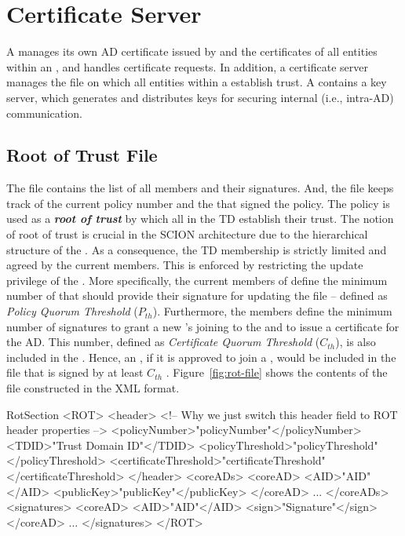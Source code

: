 \section{Certificate Server}
A \CS manages its own AD certificate issued by \TDC and the certificates of all entities within an \AD, and handles certificate requests. In addition, a \TDC certificate server manages the \RT file on which all entities within a \TD establish {trust}. A \CS contains a key server, which generates and distributes keys for securing internal (i.e., intra-AD) communication.

\subsection{Root of Trust File} \label{subsec:root-of-trust}
The \RT file contains the list of all \TDC members and their signatures. And, the file keeps track of the current policy number and the \ADs that signed the policy. The policy is used as a {\bf \em root of trust} by which all \ADs in the TD establish their trust. The notion of root of trust is crucial in the SCION architecture due to the hierarchical structure of the \TD. As a consequence, the TD membership is strictly limited and agreed by the current members. This is enforced by restricting the update privilege of the \PF. More specifically, the current members of \TDC define the minimum number of \ADs that should provide their signature for updating the \RT file -- defined as {\em Policy Quorum Threshold} ($P_{th}$). Furthermore, the \TDC members define the minimum number of \AD signatures to grant a new \AD's joining to the \TDC and to issue a certificate for the AD. This number, defined as {\em Certificate Quorum Threshold} ($C_{th}$), is also included in the \PF. Hence, an \AD, if it is approved to join a \TDC, would be included in the \RT file that is signed by at least $C_{th}$ \TDC \ADs. Figure~\ref{fig:rot-file} shows the contents of the \RT file constructed in the XML format. 

\begin{SaveVerbatim}{RotSection}
<ROT>
	<header> 
	<!-- Why we just switch this header field to ROT header properties -->
		<policyNumber>"policyNumber"</policyNumber>
		<TDID>"Trust Domain ID"</TDID>
		<policyThreshold>"policyThreshold"</policyThreshold>
		<certificateThreshold>"certificateThreshold"</certificateThreshold>
	</header>
	<coreADs>
		<coreAD>
			<AID>"AID"</AID>
			<publicKey>"publicKey"</publicKey>
		</coreAD>
		...
	</coreADs>
	<signatures>
		<coreAD>
			<AID>"AID"</AID>
			<sign>"Signature"</sign>
		</coreAD>
		...
	</signatures>
</ROT>
\end{SaveVerbatim}

